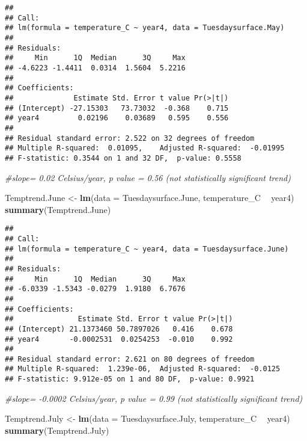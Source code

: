 \documentclass[]{article}
\newenvironment{Shaded}{\begin{snugshade}}{\end{snugshade}}
\newcommand{\CommentTok}[1]{\textcolor[rgb]{0.56,0.35,0.01}{\textit{#1}}}
\newcommand{\DataTypeTok}[1]{\textcolor[rgb]{0.13,0.29,0.53}{#1}}
\newcommand{\KeywordTok}[1]{\textcolor[rgb]{0.13,0.29,0.53}{\textbf{#1}}}
\newcommand{\NormalTok}[1]{#1}
\newcommand{\OperatorTok}[1]{\textcolor[rgb]{0.81,0.36,0.00}{\textbf{#1}}}
\newcommand{\StringTok}[1]{\textcolor[rgb]{0.31,0.60,0.02}{#1}}
\begin{document}
\begin{verbatim}
## 
## Call:
## lm(formula = temperature_C ~ year4, data = Tuesdaysurface.May)
## 
## Residuals:
##     Min      1Q  Median      3Q     Max 
## -4.6223 -1.4411  0.0314  1.5604  5.2216 
## 
## Coefficients:
##              Estimate Std. Error t value Pr(>|t|)
## (Intercept) -27.15303   73.73032  -0.368    0.715
## year4         0.02196    0.03689   0.595    0.556
## 
## Residual standard error: 2.522 on 32 degrees of freedom
## Multiple R-squared:  0.01095,    Adjusted R-squared:  -0.01995 
## F-statistic: 0.3544 on 1 and 32 DF,  p-value: 0.5558
\end{verbatim}

\begin{Shaded}
\begin{Highlighting}[]
\CommentTok{#slope= 0.02 Celsius/year, p value = 0.56 (not statistically significant trend)}

\NormalTok{Temptrend.June <-}\StringTok{ }\KeywordTok{lm}\NormalTok{(}\DataTypeTok{data =}\NormalTok{ Tuesdaysurface.June, temperature_C }\OperatorTok{~}\StringTok{ }\NormalTok{year4)}
\KeywordTok{summary}\NormalTok{(Temptrend.June)}
\end{Highlighting}
\end{Shaded}

\begin{verbatim}
## 
## Call:
## lm(formula = temperature_C ~ year4, data = Tuesdaysurface.June)
## 
## Residuals:
##     Min      1Q  Median      3Q     Max 
## -6.0339 -1.5343 -0.0279  1.9180  6.7676 
## 
## Coefficients:
##               Estimate Std. Error t value Pr(>|t|)
## (Intercept) 21.1373460 50.7897026   0.416    0.678
## year4       -0.0002531  0.0254253  -0.010    0.992
## 
## Residual standard error: 2.621 on 80 degrees of freedom
## Multiple R-squared:  1.239e-06,  Adjusted R-squared:  -0.0125 
## F-statistic: 9.912e-05 on 1 and 80 DF,  p-value: 0.9921
\end{verbatim}

\begin{Shaded}
\begin{Highlighting}[]
\CommentTok{#slope= -0.0002 Celsius/year, p value = 0.99 (not statistically significant trend)}

\NormalTok{Temptrend.July <-}\StringTok{ }\KeywordTok{lm}\NormalTok{(}\DataTypeTok{data =}\NormalTok{ Tuesdaysurface.July, temperature_C }\OperatorTok{~}\StringTok{ }\NormalTok{year4)}
\KeywordTok{summary}\NormalTok{(Temptrend.July)}
\end{Highlighting}
\end{Shaded}
\end{document}
